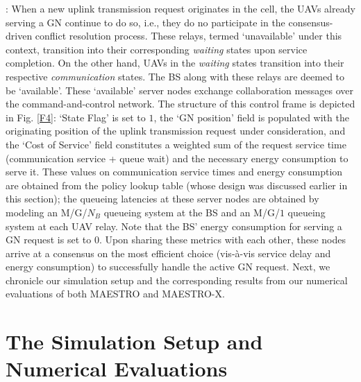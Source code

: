 \documentclass[12pt, draftcls, onecolumn]{IEEEtran}
\theoremstyle{plain}
\theoremstyle{definition}
\theoremstyle{remark}
\begin{document}
: When a new uplink transmission request originates in the cell, the UAVs already serving a GN continue to do so, i.e., they do no participate in the consensus-driven conflict resolution process. These relays, termed `unavailable' under this context, transition into their corresponding \emph{waiting} states upon service completion. On the other hand, UAVs in the \emph{waiting} states transition into their respective \emph{communication} states. The BS along with these relays are deemed to be `available'. These `available' server nodes exchange collaboration messages over the command-and-control network. The structure of this control frame is depicted in Fig. \ref{F4}: `State Flag' is set to $1$, the `GN position' field is populated with the originating position of the uplink transmission request under consideration, and the `Cost of Service' field constitutes a weighted sum of the request service time (communication service + queue wait) and the necessary energy consumption to serve it. These values on communication service times and energy consumption are obtained from the policy lookup table (whose design was discussed earlier in this section); the queueing latencies at these server nodes are obtained by modeling an M/G/$N_{B}$ queueing system at the BS and an M/G/$1$ queueing system at each UAV relay. Note that the BS' energy consumption for serving a GN request is set to $0$. Upon sharing these metrics with each other, these nodes arrive at a consensus on the most efficient choice (vis-à-vis service delay and energy consumption) to successfully handle the active GN request. Next, we chronicle our simulation setup and the corresponding results from our numerical evaluations of both MAESTRO and MAESTRO-X.
\vspace{-4mm}


\section{The Simulation Setup and Numerical Evaluations}\label{S6}
\end{document}
